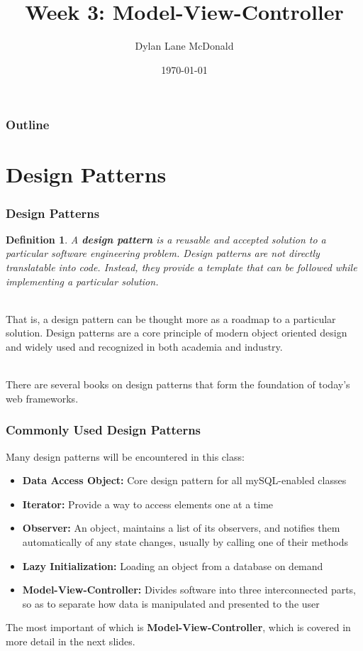 \documentclass[aspectratio=169]{beamer}
\title{Week 3: Model-View-Controller}
\author{Dylan Lane McDonald}
\institute{CNM STEMulus Center\\Web Development with PHP}
\date{\today}
\newtheorem{defn}{Definition}
\begin{document}
\lstset{language=Java}
\begin{frame}
\titlepage
\end{frame}

\begin{frame}
\frametitle{Outline}
\tableofcontents
\end{frame}

\section{Design Patterns}
\begin{frame}
\frametitle{Design Patterns}
\begin{defn}
A \textbf{design pattern} is a reusable and accepted solution to a particular software engineering problem. Design patterns are not directly translatable into code. Instead, they provide a template that can be followed while implementing a particular solution.
\end{defn}
\pause
\mbox{}\\
That is, a design pattern can be thought more as a roadmap to a particular solution. Design patterns are a core principle of modern object oriented design and widely used and recognized in both academia and industry.

\mbox{}\\
There are several books on design patterns that form the foundation of today's web frameworks. \cite{codeComplete, designPatterns, j2ee}
\end{frame}

\begin{frame}
\frametitle{Commonly Used Design Patterns}
Many design patterns will be encountered in this class:
\begin{itemize}
	\item \textbf{Data Access Object:} Core design pattern for all mySQL-enabled classes
	\item \textbf{Iterator:} Provide a way to access elements one at a time
	\item \textbf{Observer:} An object, maintains a list of its observers, and notifies them automatically of any state changes, usually by calling one of their methods
	\item \textbf{Lazy Initialization:} Loading an object from a database on demand
	\item \textbf{Model-View-Controller:} Divides software into three interconnected parts, so as to separate how data is manipulated and presented to the user
\end{itemize}
The most important of which is \textbf{Model-View-Controller}, which is covered in more detail in the next slides.
\end{frame}
\end{document}
